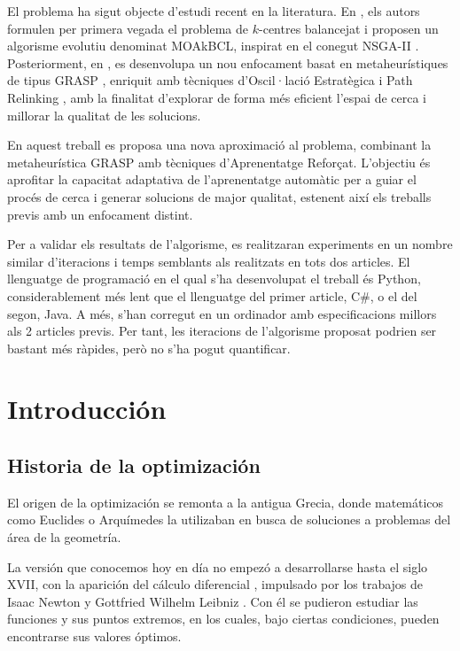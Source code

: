 \documentclass[12pt,a4paper]{book}
\begin{document}
El problema ha sigut objecte d'estudi recent en la literatura. En \cite{k-balanced_1}, els autors formulen per primera vegada el problema de $k$-centres balancejat i proposen un algorisme evolutiu denominat MOAkBCL, inspirat en el conegut NSGA-II \citep{NSGA-II}. Posteriorment, en \cite{k-Balanced_2}, es desenvolupa un nou enfocament basat en metaheurístiques de tipus GRASP \citep{GRASP}, enriquit amb tècniques d'Oscil·lació Estratègica \citep{oscillation} i Path Relinking \citep{path_relinking}, amb la finalitat d'explorar de forma més eficient l'espai de cerca i millorar la qualitat de les solucions.

En aquest treball es proposa una nova aproximació al problema, combinant la metaheurística GRASP amb tècniques d'Aprenentatge Reforçat. L'objectiu és aprofitar la capacitat adaptativa de l'aprenentatge automàtic per a guiar el procés de cerca i generar solucions de major qualitat, estenent així els treballs previs amb un enfocament distint.

Per a validar els resultats de l'algorisme, es realitzaran experiments en un nombre similar d'iteracions i temps semblants als realitzats en tots dos articles. El llenguatge de programació en el qual s'ha desenvolupat el treball és Python, considerablement més lent que el llenguatge del primer article, C\#, o el del segon, Java. A més, s'han corregut en un ordinador amb especificacions millors als 2 articles previs. Per tant, les iteracions de l'algorisme proposat podrien ser bastant més ràpides, però no s'ha pogut quantificar.
\newpage
 
\chapter{Introducción}

\section{Historia de la optimización}
El origen de la optimización se remonta a la antigua Grecia, donde matemáticos como Euclides o Arquímedes la utilizaban en busca de soluciones a problemas del área de la geometría.

La versión que conocemos hoy en día no empezó a desarrollarse hasta el siglo XVII, con la aparición del cálculo diferencial \citep{calculo_diferencial}, impulsado por los trabajos de Isaac Newton y Gottfried Wilhelm Leibniz \citep{Leibniz}. Con él se pudieron estudiar las funciones y sus puntos extremos,
en los cuales, bajo ciertas condiciones, pueden encontrarse sus valores óptimos.
\end{document}
